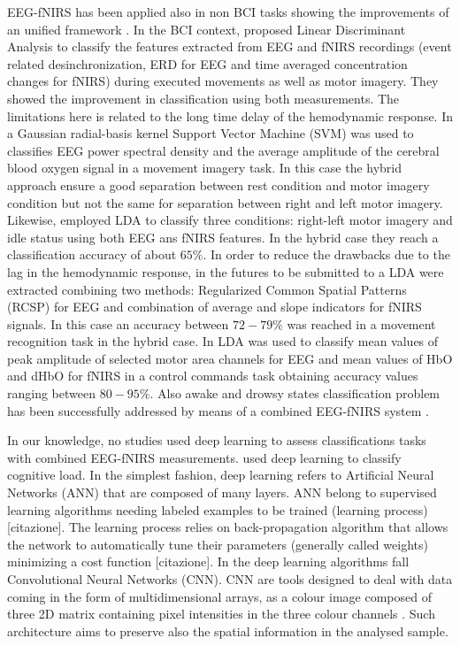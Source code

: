 \documentclass[12pt ]{iopart}
\begin{document}
EEG-fNIRS has been applied also in non BCI tasks showing the improvements of an unified framework \parencite{tongconcurrent,salvatori2006combining,croce nirs}. In the BCI context, \textcite{Fazli_2012} proposed Linear Discriminant Analysis to classify the features extracted from EEG and fNIRS recordings (event related desinchronization, ERD for EEG and time averaged concentration changes for fNIRS) during executed movements as well as motor imagery. They showed the improvement in classification using both measurements. The limitations here is related to the long time delay of the hemodynamic response. In \textcite{ma2012hybrid} a Gaussian radial-basis kernel Support Vector Machine (SVM) was used to classifies EEG power spectral density and the average amplitude of the cerebral blood oxygen signal in a movement imagery task. In this case the hybrid approach ensure a good separation between rest condition and motor imagery condition but not the same for separation between right and left motor imagery. Likewise,  \textcite{lee2014hybrid} employed LDA to classify three conditions: right-left motor imagery and idle status using both EEG ans fNIRS features. In the hybrid case they reach a classification accuracy of about $65\%$. In order to reduce the drawbacks due to the lag in the hemodynamic response, in  \textcite{buccino2016hybrid} the futures to be submitted to a LDA were extracted combining two methods: Regularized Common Spatial Patterns (RCSP) for EEG and combination of average and slope indicators for fNIRS signals. In this case an accuracy between $72-79\%$ was reached in a movement recognition task in the hybrid case. In  \textcite{khan2014decoding, khan2017hybrid} LDA was used to classify mean values of peak amplitude of selected motor area channels for EEG and mean values of HbO and dHbO for fNIRS in a control commands task obtaining accuracy values ranging between $80-95\%$. Also awake and drowsy states classification problem has been successfully addressed by means of a combined EEG-fNIRS system \parencite{nguyen2017utilization}. 

In our knowledge, no studies used deep learning to assess classifications tasks with combined EEG-fNIRS measurements. \textcite{bashivan2015learning} used deep learning to classify cognitive load. 
In the simplest fashion, deep learning  refers to Artificial Neural Networks (ANN) that are composed of many layers. ANN belong to supervised learning algorithms needing labeled examples to be trained (learning process) [citazione]. The learning process relies on back-propagation algorithm that allows the network to automatically tune their parameters (generally called weights) minimizing a cost function [citazione].   In the deep learning algorithms fall Convolutional Neural Networks (CNN). CNN are tools designed to deal with data coming in the form of multidimensional arrays,  as a colour image composed of three 2D matrix containing pixel intensities in the three colour channels \parencite{lecun2015deep}. Such architecture aims to preserve also the spatial information in the analysed sample.
\end{document}
